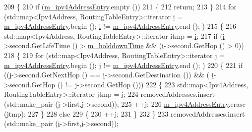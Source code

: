 \begin{DoxyCode}
209 \{
210   \textcolor{keywordflow}{if} (\hyperlink{classns3_1_1dsdv_1_1RoutingTable_a75a9563681885f40224a78d95d05ad2c}{m\_ipv4AddressEntry}.empty ())
211     \{
212       \textcolor{keywordflow}{return};
213     \}
214   \textcolor{keywordflow}{for} (std::map<Ipv4Address, RoutingTableEntry>::iterator \hyperlink{bernuolliDistribution_8m_a6f6ccfcf58b31cb6412107d9d5281426}{i} = 
      \hyperlink{classns3_1_1dsdv_1_1RoutingTable_a75a9563681885f40224a78d95d05ad2c}{m\_ipv4AddressEntry}.begin (); \hyperlink{bernuolliDistribution_8m_a6f6ccfcf58b31cb6412107d9d5281426}{i} != \hyperlink{classns3_1_1dsdv_1_1RoutingTable_a75a9563681885f40224a78d95d05ad2c}{m\_ipv4AddressEntry}.end (); )
215     \{
216       std::map<Ipv4Address, RoutingTableEntry>::iterator itmp = \hyperlink{bernuolliDistribution_8m_a6f6ccfcf58b31cb6412107d9d5281426}{i};
217       \textcolor{keywordflow}{if} (\hyperlink{bernuolliDistribution_8m_a6f6ccfcf58b31cb6412107d9d5281426}{i}->second.GetLifeTime () > \hyperlink{classns3_1_1dsdv_1_1RoutingTable_a14506862d80e39a9bb5f899fd56e316b}{m\_holddownTime} && (\hyperlink{bernuolliDistribution_8m_a6f6ccfcf58b31cb6412107d9d5281426}{i}->second.GetHop () > 0))
218         \{
219           \textcolor{keywordflow}{for} (std::map<Ipv4Address, RoutingTableEntry>::iterator j = 
      \hyperlink{classns3_1_1dsdv_1_1RoutingTable_a75a9563681885f40224a78d95d05ad2c}{m\_ipv4AddressEntry}.begin (); j != \hyperlink{classns3_1_1dsdv_1_1RoutingTable_a75a9563681885f40224a78d95d05ad2c}{m\_ipv4AddressEntry}.end (); )
220             \{
221               \textcolor{keywordflow}{if} ((j->second.GetNextHop () == \hyperlink{bernuolliDistribution_8m_a6f6ccfcf58b31cb6412107d9d5281426}{i}->second.GetDestination ()) && (
      \hyperlink{bernuolliDistribution_8m_a6f6ccfcf58b31cb6412107d9d5281426}{i}->second.GetHop () != j->second.GetHop ()))
222                 \{
223                   std::map<Ipv4Address, RoutingTableEntry>::iterator jtmp = j;
224                   removedAddresses.insert (std::make\_pair (j->first,j->second));
225                   ++j;
226                   \hyperlink{classns3_1_1dsdv_1_1RoutingTable_a75a9563681885f40224a78d95d05ad2c}{m\_ipv4AddressEntry}.erase (jtmp);
227                 \}
228               \textcolor{keywordflow}{else}
229                 \{
230                   ++j;
231                 \}
232             \}
233           removedAddresses.insert (std::make\_pair (\hyperlink{bernuolliDistribution_8m_a6f6ccfcf58b31cb6412107d9d5281426}{i}->first,\hyperlink{bernuolliDistribution_8m_a6f6ccfcf58b31cb6412107d9d5281426}{i}->second));

\end{DoxyCode}
